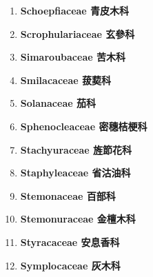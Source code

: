 \begin{enumerate}
        
      \item[] \begin{small}\textbf{Schoepfiaceae 青皮木科} \end{small}
        
      \item[] \begin{small}\textbf{Scrophulariaceae 玄參科} \end{small}
        
      \item[] \begin{small}\textbf{Simaroubaceae 苦木科} \end{small}
        
      \item[] \begin{small}\textbf{Smilacaceae 菝葜科} \end{small}
        
      \item[] \begin{small}\textbf{Solanaceae 茄科} \end{small}
        
      \item[] \begin{small}\textbf{Sphenocleaceae 密穗桔梗科} \end{small}
        
      \item[] \begin{small}\textbf{Stachyuraceae 旌節花科} \end{small}
        
      \item[] \begin{small}\textbf{Staphyleaceae 省沽油科} \end{small}
        
      \item[] \begin{small}\textbf{Stemonaceae 百部科} \end{small}
        
      \item[] \begin{small}\textbf{Stemonuraceae 金檀木科} \end{small}
        
      \item[] \begin{small}\textbf{Styracaceae 安息香科} \end{small}
        
      \item[] \begin{small}\textbf{Symplocaceae 灰木科} \end{small}

\end{enumerate}
